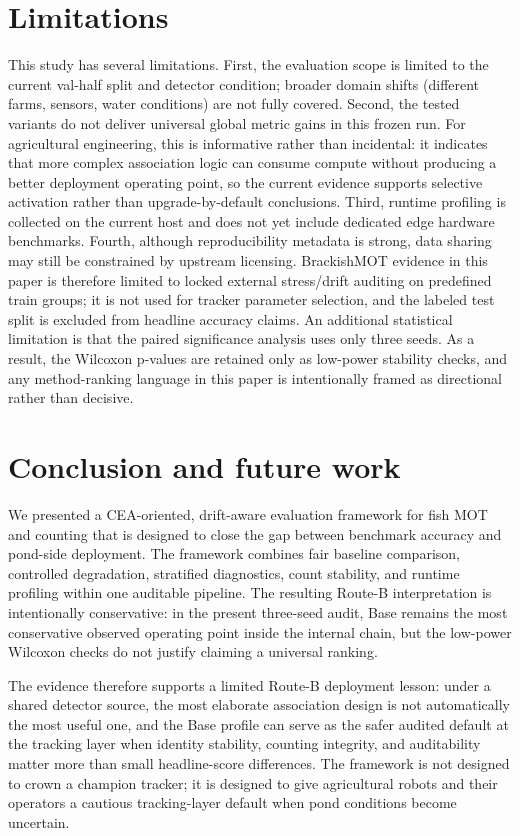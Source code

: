\documentclass[5p,twocolumn,a4paper]{elsarticle}
\begin{document}
\section{Limitations}
This study has several limitations. First, the evaluation scope is limited to the current val-half split and detector condition; broader domain shifts (different farms, sensors, water conditions) are not fully covered. Second, the tested variants do not deliver universal global metric gains in this frozen run. For agricultural engineering, this is informative rather than incidental: it indicates that more complex association logic can consume compute without producing a better deployment operating point, so the current evidence supports selective activation rather than upgrade-by-default conclusions. Third, runtime profiling is collected on the current host and does not yet include dedicated edge hardware benchmarks. Fourth, although reproducibility metadata is strong, data sharing may still be constrained by upstream licensing.
BrackishMOT evidence in this paper is therefore limited to locked external stress/drift auditing on predefined train groups; it is not used for tracker parameter selection, and the labeled test split is excluded from headline accuracy claims.
An additional statistical limitation is that the paired significance analysis uses only three seeds. As a result, the Wilcoxon p-values are retained only as low-power stability checks, and any method-ranking language in this paper is intentionally framed as directional rather than decisive.

\section{Conclusion and future work}
We presented a CEA-oriented, drift-aware evaluation framework for fish MOT and counting that is designed to close the gap between benchmark accuracy and pond-side deployment. The framework combines fair baseline comparison, controlled degradation, stratified diagnostics, count stability, and runtime profiling within one auditable pipeline.
The resulting Route-B interpretation is intentionally conservative: in the present three-seed audit, Base remains the most conservative observed operating point inside the internal chain, but the low-power Wilcoxon checks do not justify claiming a universal ranking.

The evidence therefore supports a limited Route-B deployment lesson: under a shared detector source, the most elaborate association design is not automatically the most useful one, and the Base profile can serve as the safer audited default at the tracking layer when identity stability, counting integrity, and auditability matter more than small headline-score differences.
The framework is not designed to crown a champion tracker; it is designed to give agricultural robots and their operators a cautious tracking-layer default when pond conditions become uncertain.
\end{document}
